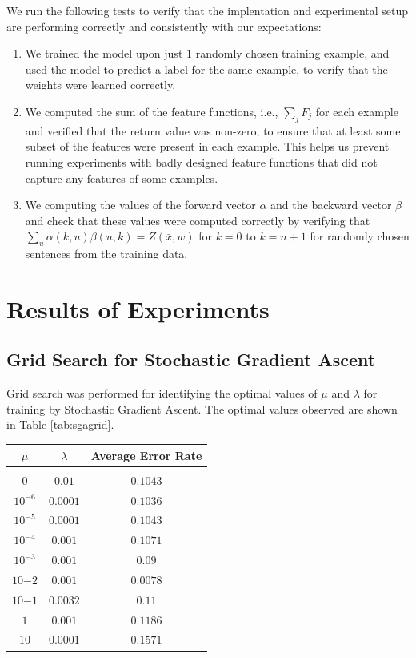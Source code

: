 \documentclass[11pt,a4paper,oneside]{article}
\begin{document}
We run the following tests to verify that the implentation and experimental setup are performing correctly and consistently with our expectations:

\begin{enumerate}
\item We trained the model upon just $1$ randomly chosen training example, and used the model to predict a label for the same example, to verify that the weights were learned correctly.
\item We computed the sum of the feature functions, i.e., $\sum_{j}F_j$ for each example and verified that the return value was non-zero, to ensure that at least some subset of the features were present in each example. This helps us prevent running experiments with badly designed feature functions that did not capture any features of some examples.
\item We computing the values of the forward vector $\alpha$ and the backward vector $\beta$ and check that these values were computed correctly by verifying that $\sum_u\alpha(k, u)\beta(u,k) = Z(\bar{x}, w)$ for $k = 0$ to $k = n + 1$ for randomly chosen sentences from the training data.
\end{enumerate}

\section{Results of Experiments}
\label{sec:Results}

\subsection{Grid Search for Stochastic Gradient Ascent}

Grid search was performed for identifying the optimal values of $\mu$ and $\lambda$ for training by Stochastic Gradient Ascent. The optimal values observed are shown in Table \ref{tab:sgagrid}.


\begin{center}
\begin{tabular}{|c|c|c|}
\hline
$\mu$ & $\lambda$ & Average Error Rate\\\hline
& & \\
$0$ & $0.01$ & $0.1043$\\\hline
$10^{-6}$ & $0.0001$ & $0.1036$\\\hline
$10^{-5}$ & $0.0001$ & $0.1043$\\\hline
$10^{-4}$ & $0.001$ & $0.1071$\\\hline
$10^{-3}$ & $0.001$ & $0.09$\\\hline
$10{-2}$ & $0.001$ & $0.0078$\\\hline
$10{-1}$ & $0.0032$ & $0.11$\\\hline
$1$ & $0.001$ & $0.1186$\\\hline
$10$ & $0.0001$ & $0.1571$\\\hline
\end{tabular}
\end{center}
\end{document}
